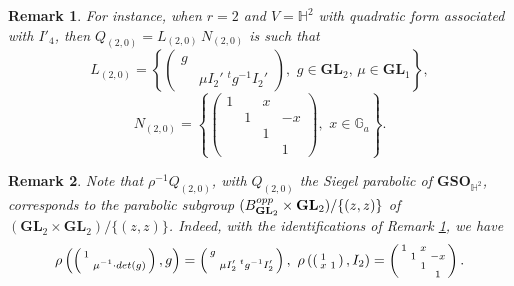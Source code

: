\documentclass[10pt,a4paper]{amsart}
\newtheorem{remark}{Remark}
\def\GL{\mathbf{GL}}
\begin{document}
\begin{remark}\label{remark_stupid_on_Siegel_parabolic_so22}
For instance, when $r = 2$ and $V = \mathbb{H}^2$ with quadratic form associated with $I'_4$, then $Q_{(2,0)} = L_{(2,0)}\, N_{(2,0)} $ is such that 
\[L_{(2,0)} = \left \{ \left(\begin{smallmatrix} g  & \\ &\mu I_2'\;^{t}g^{-1}I_2'\end{smallmatrix}\right), \,\, g \in \GL_2, \, \mu \in \GL_1 \right \},\]
\[N_{(2,0)} = \left \{ \left(\begin{smallmatrix} 1 & & x & \\ & 1 & & -x\\ & & 1 & \\ & & & 1 \end{smallmatrix}\right), \,\, x \in \mathbb{G}_a \right \}.\]
\end{remark}

\begin{remark}\label{Remark:Siegel:Parabolic:Exceptional}
    Note that $\rho^{-1}Q_{(2,0)}$, with $Q_{(2,0)}$  the Siegel parabolic of $\mathbf{GSO}_{\mathbb{H}^2}$, corresponds to the parabolic subgroup $(B_{\GL_2}^{\rm opp} \times \GL_2) /\{ (z,z)\}$ of $(\GL_2 \times \GL_2)/\{ (z,z)\}$. Indeed, with the identifications of Remark \ref{remark_stupid_on_Siegel_parabolic_so22}, we have
\[\rho \left( \left(\begin{smallmatrix}
    1 &  \\  & {\mu}^{-1} \cdot {\rm det}(g) 
\end{smallmatrix} \right), g \right) =  \left(\begin{smallmatrix} g  & \\ &\mu I_2'\;^{t}g^{-1}I_2'\end{smallmatrix}\right),\, \,  \rho \left( \left(\begin{smallmatrix}
    1 &  \\ x & 1 
\end{smallmatrix} \right), I_2 \right) = \left(\begin{smallmatrix} 1 & & x & \\ & 1 & & -x\\ & & 1 & \\ & & & 1 \end{smallmatrix}\right). \]
\end{remark}
\end{document}
